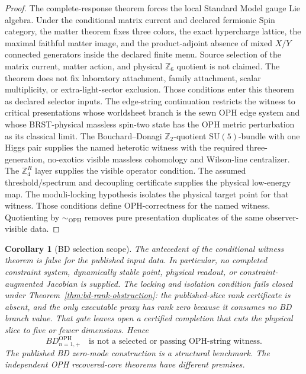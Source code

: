 \documentclass[11pt]{article}
\newtheorem{corollary}[theorem]{Corollary}
\theoremstyle{remark}
\theoremstyle{plain}
\newcommand{\OPH}{\mathrm{OPH}}
\newcommand{\SU}{\mathrm{SU}}
\newcommand{\Z}{\mathbb Z}
\newcommand{\ZfourR}{\mathbb Z_4^R}
\newcommand{\Teq}{\sim_{\OPH}}
\begin{document}
\begin{proof}
The complete-response theorem forces the local Standard Model gauge Lie algebra. Under the
conditional matrix current and declared fermionic Spin category, the matter
theorem fixes three colors, the exact hypercharge lattice,
the maximal faithful matter image, and the product-adjoint absence of mixed \(X/Y\)
connected generators inside the declared finite menu. Source selection of
the matrix current, matter action, and physical \(\mathbb Z_6\) quotient is
not claimed. The theorem does not fix laboratory
attachment, family attachment, scalar multiplicity, or extra-light-sector exclusion. Those
conditions enter this theorem as declared selector inputs. The edge-string continuation restricts
the witness to critical presentations
whose worldsheet branch is the sewn OPH edge system and whose BRST-physical massless spin-two state
has the OPH metric perturbation as its classical limit. The Bouchard--Donagi
\(\Z_2\)-quotient \(\SU(5)\)-bundle
with one Higgs pair supplies the named heterotic witness with the required three-generation,
no-exotics visible massless cohomology and Wilson-line centralizer. The \(\ZfourR\) layer supplies the visible
operator condition. The assumed threshold/spectrum and decoupling certificate supplies the physical
low-energy map. The moduli-locking hypothesis isolates the physical target point for that witness.
Those conditions define OPH-correctness for the named witness. Quotienting by
\(\Teq\) removes pure presentation duplicates of the same observer-visible data.
\end{proof}

\begin{corollary}[BD selection scope]\label{cor:bd-selection-scope}
The antecedent of the conditional witness theorem is false for the published input data. In
particular, no completed constraint system, dynamically stable point, physical readout, or
constraint-augmented Jacobian is supplied. The locking and isolation condition fails closed under
Theorem~\ref{thm:bd-rank-obstruction}: the published-slice rank certificate is absent, and the
only executable proxy has rank zero because it consumes no BD branch value. That gate leaves open a
certified completion that cuts the physical slice to five or fewer dimensions. Hence
\[
BD_{n=1,+}^{\OPH}
\quad\text{is not a selected or passing OPH-string witness.}
\]
The published BD zero-mode construction is a structural benchmark.
The independent OPH recovered-core theorems have different premises.
\end{corollary}
\end{document}
